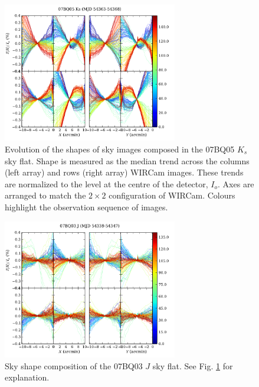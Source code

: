 \documentclass[iop]{emulateapj}
\begin{document}
\begin{figure}[t]
    \centering
        \includegraphics[width=3in]{figs/07BQ05_Ks.pdf}
    \caption{Evolution of the shapes of sky images composed in the 07BQ05 $K_s$ sky flat. Shape is measured as the median trend across the columns (left array) and rows (right array) WIRCam images. These trends are normalized to the level at the centre of the detector, $I_o$. Axes are arranged to match the $2 \times 2$ configuration of WIRCam. Colours highlight the observation sequence of images.}
    \label{fig:flat_07BQ05_Ks}
\end{figure}


\begin{figure}[t]
   \centering
       \includegraphics[width=3in]{figs/07BQ03_J.pdf}
   \caption[Sky shape composition of the 07BQ03 $J$ sky flat]{Sky shape composition of the 07BQ03 $J$ sky flat. See Fig. \ref{fig:flat_07BQ05_Ks} for explanation.}
   \label{fig:flat_07BQ03_J}
\end{figure}
\end{document}
